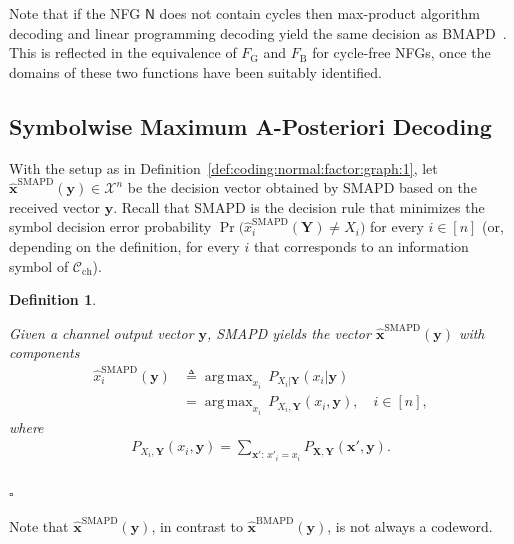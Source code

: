 \documentclass[journal, twocolumn]{IEEEtran}
\renewcommand{\mathbf}[1]{{\bm{#1}}}
\DeclareMathOperator*{\argmax}{arg\,max}
\newcommand{\vect}[1]{\mathbf{#1}}
\newcommand{\code}[1]{\mathcal{#1}}
\newcommand{\set}[1]{\mathcal{#1}}
\newcommand{\graph}[1]{\mathsf{#1}}
\newcommand{\defeq}{\triangleq}
\newcommand{\codeCchannel}{\code{C}_{\mathrm{ch}}}
\newcommand{\setX}{\set{X}}
\newcommand{\vX}{\vect{X}}
\newcommand{\vx}{\vect{x}}
\newcommand{\hvxSMAPD}{\vect{\hat x}^{\mathrm{SMAPD}}}
\newcommand{\hxSMAPD}{\hat x^{\mathrm{SMAPD}}}
\newcommand{\hvxBMAPD}{\vect{\hat x}^{\mathrm{BMAPD}}}
\newcommand{\vY}{\vect{Y}}
\newcommand{\vy}{\vect{y}}
\newcommand{\graphN}{\graph{N}}
\newcommand{\FBethe}{F_{\mathrm{B}}}
\newcommand{\?}{\mathrm{?}}
\newcommand{\qedwhite}{\hspace*{\fill}%
  $\square$\smallskip}
\newcommand{\defend}{\qedwhite}
\newcommand{\FGibbs}{F_{\mathrm{G}}}
\newtheorem{Definition}[Lemma]{Definition}
\begin{document}
Note that if the NFG $\graphN$ does not contain cycles then max-product
algorithm decoding and linear programming decoding yield the same decision as
BMAPD~\cite{Kschischang:Frey:Loeliger:01}. This is reflected in the
equivalence of $\FGibbs$ and $\FBethe$ for cycle-free NFGs, once the domains
of these two functions have been suitably identified.


\subsection{Symbolwise Maximum A-Posteriori Decoding}
\label{sec:SMAPD:1}


With the setup as in Definition~\ref{def:coding:normal:factor:graph:1}, let
$\hvxSMAPD(\vy) \in \setX^n$ be the decision vector obtained by SMAPD based on
the received vector $\vy$. Recall that SMAPD is the decision rule that
minimizes the symbol decision error probability $\operatorname{Pr}\bigl(
\hxSMAPD_i(\vY) \neq X_i \bigr)$ for every $i \in [n]$ (or, depending on the
definition, for every $i$ that corresponds to an information symbol of
$\codeCchannel$).


\begin{Definition}
  \label{def:SMAPD:1}

  Given a channel output vector $\vy$, SMAPD yields the vector
  $\hvxSMAPD(\vy)$ with components
  \begin{align*}
    \hxSMAPD_i(\vy)
      &\defeq
         \argmax_{x_i} \,
           P_{X_i|\vY}(x_i | \vy)\nonumber \\
      &= \argmax_{x_i} \,
           P_{X_i, \vY}(x_i, \vy),
             \quad i \in [n], 
  \end{align*}
  where
  \begin{align}
    P_{X_i, \vY}(x_i, \vy)
      = \sum_{\vx': \, x'_i = x_i}
          P_{\vX, \vY}(\vx',\vy).
            \label{eq:SMAPD:marginal:1}
  \end{align}
  \mbox{} \\[-0.5cm]
  \defend
\end{Definition}


Note that $\hvxSMAPD(\vy)$, in contrast to $\hvxBMAPD(\vy)$, is not always a
codeword.
\end{document}
